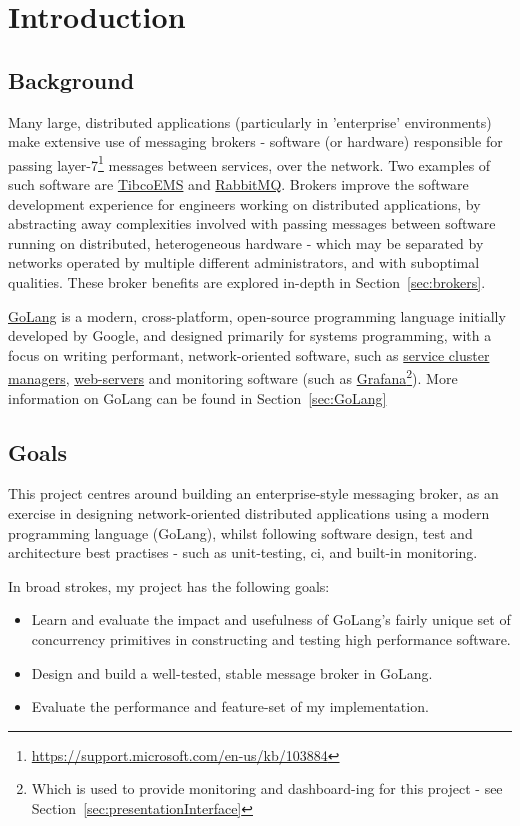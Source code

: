 \chapter{Introduction}
\label{chap:Introduction}

\section{Background}
\label{sec:background}

Many large, distributed applications (particularly in 'enterprise' environments)
make extensive use of messaging brokers - software (or
hardware\cite{solaceappliances}) responsible for passing
layer-7\footnote{\url{https://support.microsoft.com/en-us/kb/103884}} messages
between services, over the network. Two examples of such software are
\href{http://www.tibco.com/products/automation/enterprise-messaging/enterprise-message-service}{TibcoEMS}
and \href{https://www.rabbitmq.com/}{RabbitMQ}. Brokers improve the software
development experience for engineers working on distributed applications, by
abstracting away complexities involved with passing messages between software
running on distributed, heterogeneous hardware - which may be separated by
networks operated by multiple different administrators, and with suboptimal
qualities\cite{fallacies}. These broker benefits are explored in-depth in
Section~\ref{sec:brokers}.

\href{https://golang.org/}{GoLang} is a modern, cross-platform, open-source
programming language initially developed by Google, and designed primarily for
systems programming, with a focus on writing performant, network-oriented
software, such as \href{https://github.com/kubernetes/kubernetes}{service
cluster managers}, \href{https://github.com/mholt/caddy}{web-servers} and
monitoring software (such as
\href{https://github.com/grafana/grafana}{Grafana}\footnote{Which is used to
provide monitoring and dashboard-ing for this project - see
Section~\ref{sec:presentationInterface}}). More information on GoLang can be
found in Section~\ref{sec:GoLang}

\section{Goals}
This project centres around building an enterprise-style messaging broker, as an
exercise in designing network-oriented distributed applications using a modern
programming language (GoLang), whilst following software design, test and
architecture best practises - such as unit-testing, \gls{ci}, and
built-in monitoring.

In broad strokes, my project has the following goals:

 \begin{itemize}
   \item Learn and evaluate the impact and usefulness of GoLang's fairly unique
   set of concurrency primitives in constructing and testing high performance
   software.
   \item Design and build a well-tested, stable message broker in GoLang.
   \item Evaluate the performance and feature-set of my implementation.
 \end{itemize}
